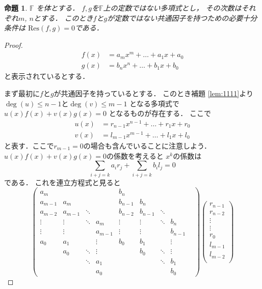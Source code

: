 \documentclass[leqno, a4paper, 12pt]{jsarticle}
\newtheorem{prop}[thm]{命題}
\newcommand{\myfi}{\mathbb{F}}
\newcommand{\myres}{\mathrm{Res}}
\begin{document}
\begin{prop}\label{prop:2222}
$\myfi$
を体とする．
$f, g$を$\myfi$上の定数ではない多項式とし，
その次数はそれぞれ$m$, $n$とする．
このとき$f$と$g$が定数ではない共通因子を持つための必要十分条件は
$\myres(f, g)=0$である．
\end{prop}
\begin{proof}
\begin{align}
f(x)&=a_{m}x^{m}+\dots+a_{1}x+a_{0}\\
g(x)&=b_{n}x^{n}+\dots +b_{1}x+b_{0}
\end{align}
と表示されているとする．

まず最初に$f$と$g$が共通因子を持っているとする．
このとき補題  
\ref{lem:1111}より$\deg(u)\le n-1$と$\deg(v)\le m-1$
となる多項式で
$u(x)f(x)+v(x)g(x)=0$
となるものが存在する．
ここで
\begin{align}
u(x)&=r_{n-1}x^{n-1}+\dots+r_{1}x+r_{0}\\
v(x)&=l_{m-1}x^{m-1}+\dots +l_{1}x+l_{0}
\end{align}
と表す．ここで$r_{m-1}=0$の場合も含んでいることに注意しよう．
$u(x)f(x)+v(x)g(x)=0$の係数を考えると
$x^{k}$の係数は
\[
\sum_{i+j=k}a_{i}r_{j}+\sum_{i+j=k}b_{i}l_{j}=0
\]
である．
これを連立方程式と見ると
\[
\begin{pmatrix}
a_{m}    &         &     &     & b_{n}   &         &     &     &  \\
a_{m-1} & a_{m}&     &     & b_{n-1}& b_{n} &     &    & \\
a_{m-2} & a_{m-1}&  \ddots&     & b_{n-2} & b_{n-1}& \ddots &    &\\
\vdots & \vdots &  \ddots& a_{m}&\vdots & \vdots&  \ddots& b_{n}&\\
\vdots&\vdots&   &    a_{m-1}& \vdots & \vdots & & b_{n-1}& \\
a_{0} & a_{1} & &  \vdots & b_{0} & b_{1} & &\vdots &  \\
   & a_{0}  & \ddots & \vdots &  & b_{0}& \ddots& \vdots & \\
   &   &\ddots & a_{1}&  & & \ddots& b_{1}&\\
   & & & a_{0} & & & & b_{0}& 
\end{pmatrix}
\begin{pmatrix}
r_{n-1}\\
r_{n-2}\\
\vdots\\
\vdots\\
r_{0}\\
l_{m-1}\\
l_{m-2}\\

\end{pmatrix}\]
\end{proof}
\end{document}
